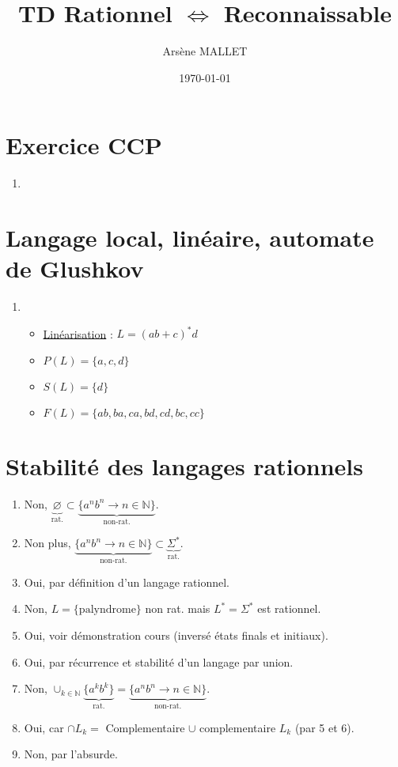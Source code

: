 \documentclass{article}
\title{TD Rationnel $\Longleftrightarrow$ Reconnaissable}
\date{\today}
\author{Arsène MALLET}
\newcommand{\bb}[1]{\mathbb{#1}}
\newcommand{\image}[3]{ %
    \begin{minipage}[t]{\linewidth}
        #1
        \adjustbox{valign=t}{
            \texttt{[image: \#3]}
        }
    \end{minipage}}
\begin{document}
\thispagestyle{firstpage}

\begin{center}
    \huge\bfseries{\@title}
\end{center}

\section{Exercice CCP}
\begin{enumerate}
    \item \image{\centering}{0.25}{I-1/I-1.pdf}
\end{enumerate}
\section{Langage local, lin\'eaire, automate de Glushkov}
\begin{enumerate}
    \item \begin{itemize}
        \item \underline{Linéarisation} : $L = (ab + c)^*d$
        \item $P(L) = \{a, c, d \}$
        \item $S(L) = \{d\}$
        \item $F(L) = \{ab, ba, ca, bd, cd, bc, cc\}$
    \end{itemize}
    \image{\centering}{0.8}{II-1/II-1.pdf}
\end{enumerate}

\section{Stabilit\'e des langages rationnels}

\begin{enumerate}
    \item Non, $\underbrace{\varnothing}_{\text{rat.}} \subset \underbrace{\{a^nb^n \to n \in \bb{N} \}}_{\text{non-rat.}}$.
    \item Non plus, $\underbrace{\{a^nb^n \to n \in \bb{N} \}}_{\text{non-rat.}} \subset \underbrace{\Sigma^*}_{\text{rat.}}$.
    \item Oui, par définition d'un langage rationnel.
    \item Non, $L = \{\text{palyndrome}\}$ non rat. mais $L^* = \Sigma^*$ est rationnel.
    \item Oui, voir démonstration cours (inversé états finals et initiaux).
    \item Oui, par récurrence et stabilité d'un langage par union.
    \item Non, $\cup_{k \in \bb{N}} \underbrace{\{a^kb^k\}}_{\text{rat.}} = \underbrace{\{a^nb^n \to n \in \bb{N}\}}_{\text{non-rat.}}$.
    \item Oui, car $\cap L_k =$ Complementaire $\cup$ complementaire $L_k$ (par 5 et 6).
    \item Non, par l'absurde.
\end{enumerate}
\end{document}
